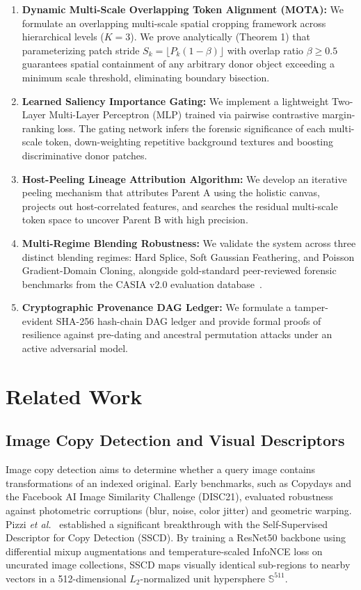\documentclass[journal]{IEEEtran}
\begin{document}
\begin{enumerate}
    \item \textbf{Dynamic Multi-Scale Overlapping Token Alignment (MOTA):} We formulate an overlapping multi-scale spatial cropping framework across hierarchical levels ($K=3$). We prove analytically (Theorem 1) that parameterizing patch stride $S_k = \lfloor P_k(1 - \beta) \rfloor$ with overlap ratio $\beta \ge 0.5$ guarantees spatial containment of any arbitrary donor object exceeding a minimum scale threshold, eliminating boundary bisection.
    \item \textbf{Learned Saliency Importance Gating:} We implement a lightweight Two-Layer Multi-Layer Perceptron (MLP) trained via pairwise contrastive margin-ranking loss. The gating network infers the forensic significance of each multi-scale token, down-weighting repetitive background textures and boosting discriminative donor patches.
    \item \textbf{Host-Peeling Lineage Attribution Algorithm:} We develop an iterative peeling mechanism that attributes Parent A using the holistic canvas, projects out host-correlated features, and searches the residual multi-scale token space to uncover Parent B with high precision.
    \item \textbf{Multi-Regime Blending Robustness:} We validate the system across three distinct blending regimes: Hard Splice, Soft Gaussian Feathering, and Poisson Gradient-Domain Cloning, alongside gold-standard peer-reviewed forensic benchmarks from the CASIA v2.0 evaluation database~\cite{Dong2013CASIA}.
    \item \textbf{Cryptographic Provenance DAG Ledger:} We formulate a tamper-evident SHA-256 hash-chain DAG ledger and provide formal proofs of resilience against pre-dating and ancestral permutation attacks under an active adversarial model.
\end{enumerate}

\section{Related Work}

\subsection{Image Copy Detection and Visual Descriptors}
Image copy detection aims to determine whether a query image contains transformations of an indexed original. Early benchmarks, such as Copydays and the Facebook AI Image Similarity Challenge (DISC21), evaluated robustness against photometric corruptions (blur, noise, color jitter) and geometric warping. Pizzi \textit{et al.}~\cite{Pizzi2022SSCD} established a significant breakthrough with the Self-Supervised Descriptor for Copy Detection (SSCD). By training a ResNet50 backbone using differential mixup augmentations and temperature-scaled InfoNCE loss on uncurated image collections, SSCD maps visually identical sub-regions to nearby vectors in a 512-dimensional $L_2$-normalized unit hypersphere $\mathbb{S}^{511}$. 
\end{document}
